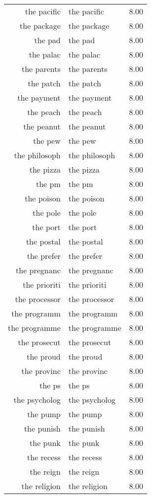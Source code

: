 \begin{table}[ht]
\begin{tabular}{rlr}
  the pacific & the pacific & 8.00 \\ 
  the package & the package & 8.00 \\ 
  the pad & the pad & 8.00 \\ 
  the palac & the palac & 8.00 \\ 
  the parents & the parents & 8.00 \\ 
  the patch & the patch & 8.00 \\ 
  the payment & the payment & 8.00 \\ 
  the peach & the peach & 8.00 \\ 
  the peanut & the peanut & 8.00 \\ 
  the pew & the pew & 8.00 \\ 
  the philosoph & the philosoph & 8.00 \\ 
  the pizza & the pizza & 8.00 \\ 
  the pm & the pm & 8.00 \\ 
  the poison & the poison & 8.00 \\ 
  the pole & the pole & 8.00 \\ 
  the port & the port & 8.00 \\ 
  the postal & the postal & 8.00 \\ 
  the prefer & the prefer & 8.00 \\ 
  the pregnanc & the pregnanc & 8.00 \\ 
  the prioriti & the prioriti & 8.00 \\ 
  the processor & the processor & 8.00 \\ 
  the programm & the programm & 8.00 \\ 
  the programme & the programme & 8.00 \\ 
  the prosecut & the prosecut & 8.00 \\ 
  the proud & the proud & 8.00 \\ 
  the provinc & the provinc & 8.00 \\ 
  the ps & the ps & 8.00 \\ 
  the psycholog & the psycholog & 8.00 \\ 
  the pump & the pump & 8.00 \\ 
  the punish & the punish & 8.00 \\ 
  the punk & the punk & 8.00 \\ 
  the recess & the recess & 8.00 \\ 
  the reign & the reign & 8.00 \\ 
  the religion & the religion & 8.00 \\ 

\end{tabular}
\end{table}
